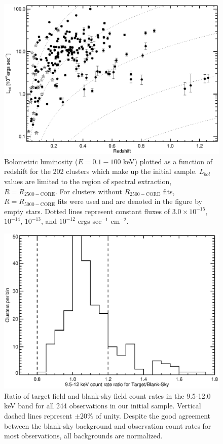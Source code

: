 \clearpage
\begin{figure}
\begin{center}
\includegraphics*[width=\textwidth, trim=0mm 0mm 0mm 0mm, clip]{f1.eps}
\caption{
Bolometric luminosity ($E = 0.1-100$ keV) plotted as a function of
redshift for the 202 clusters which make up the initial
sample. $L_{bol}$ values are limited to the region of spectral
extraction, $R=R_{2500-\mathrm{CORE}}$. For clusters without
$R_{2500-\mathrm{CORE}}$ fits, $R=R_{5000-\mathrm{CORE}}$ fits were
used and are denoted in the figure by empty stars. Dotted lines
represent constant fluxes of $3.0\times10^{-15}$, $10^{-14}$,
$10^{-13}$, and $10^{-12}$ ergs sec$^{-1}$ cm$^{-2}$.
}
\label{fig:lx_z}
\end{center}
\end{figure}
\clearpage

\clearpage
\begin{figure}
\begin{center}
\includegraphics*[width=\textwidth, trim=5mm 0mm 0mm 0mm, clip]{f2.eps}
\caption{
Ratio of target field and blank-sky field count rates in the 9.5-12.0
keV band for all 244 observations in our initial sample. Vertical
dashed lines represent $\pm 20\%$ of unity. Despite the good agreement
between the blank-sky background and observation count rates for most
observations, all backgrounds are normalized.
}
\label{fig:bgd}
\end{center}
\end{figure}
\clearpage

